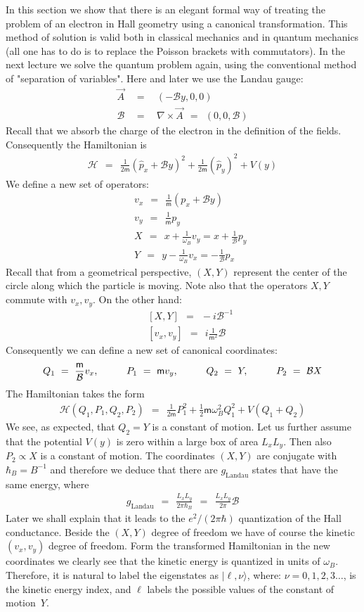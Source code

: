 \documentclass[onecolumn,fleqn]{revtex4}
\newcommand{\mass}{\mathsf{m}}
\newcommand{\beq}{\begin{eqnarray}}
\newcommand{\eeq}{\end{eqnarray}}
\begin{document}
In this section we show that there is 
an elegant formal way of treating the problem 
of an electron in Hall geometry using 
a canonical transformation. 
This method of solution is valid both in classical 
mechanics and in quantum mechanics (all one has to 
do is to replace the Poisson brackets with commutators). 
In the next lecture we solve the quantum problem 
again, using the conventional method of "separation of variables". 
Here and later we use the Landau gauge: 
\beq
\vec{A} & \ \ = \ \ & (-\mathcal{B}y,0,0)
\\ \nonumber
\mathcal{B} & \ \ = \ \ & \nabla \times \vec{A} \ \ = \ \ (0,0,\mathcal{B}) 
\eeq
Recall that we absorb the charge of the electron 
in the definition of the fields. 
Consequently the Hamiltonian is 
\beq
\mathcal{H} 
\ \ = \ \ \frac{1}{2\mass}( \hat{p}_x+\mathcal{B}y)^2 
+ \frac{1}{2\mass}( \hat{p}_y)^2 + V(y) 
\eeq
We define a new set of operators:
\beq
&& v_x \ \ = \ \ \frac{1}{\mass}( p_x + \mathcal{B}y )
\\ \nonumber
&& v_y \ \ = \ \ \frac{1}{\mass} p_y
\\ \nonumber
&& X \ \ = \ \ x + \frac{1}{\omega_B} v_y = x + \frac{1}{\mathcal{B}}p_y
\\ \nonumber
&& Y \ \ = \ \ y - \frac{1}{\omega_B} v_x = - \frac{1}{\mathcal{B}} p_x 
\eeq
Recall that from a geometrical perspective, ${(X,Y)}$ represent 
the center of the circle along which the particle is moving. 
Note also that the operators ${X,Y}$ 
commute with ${v_x,v_y}$. On the other hand:
\beq
&& [X,Y] \ \ = \ \ -i\mathcal{B}^{-1} 
\\ \nonumber
&& [v_x, v_y] \ \ = \ \ i\frac{1}{\mass^2} \mathcal{B} 
\eeq
Consequently we can define a new set of canonical coordinates:
\beq
Q_1 \ = \ \frac{\mass}{\mathcal{B}} v_x,
\hspace*{1cm}
P_1 \ = \ \mass v_y,
\hspace*{1cm}
Q_2 \ = \ Y,
\hspace*{1cm}
P_2 \ = \ \mathcal{B} X 
\eeq
The Hamiltonian takes the form
\beq
\mathcal{H}(Q_1,P_1,Q_2,P_2) 
\ \ = \ \ \frac{1}{2\mass}P_1^2 
+ \frac{1}{2} \mass \omega_B^2 Q_1^2 
+ V(Q_1 + Q_2) 
\eeq
We see, as expected, that ${Q_2 = Y}$ is a constant of motion. 
Let us further assume that the potential $V(y)$ is zero within 
a large box of area $L_xL_y$. Then also ${P_2 \propto X}$ 
is a constant of motion. The coordinates ${(X,Y)}$ are 
conjugate with $\hbar_B=B^{-1}$ and therefore we deduce that 
there are $g_{\text{Landau}}$ states that have the same energy, where 
\beq
g_{\text{Landau}} 
\ \ = \ \ \frac{L_x L_y}{2\pi \hbar_B}
\ \ = \ \ \frac{L_x L_y}{2\pi}\mathcal{B} 
\eeq
Later we shall explain that it leads to the $e^2/(2\pi\hbar)$ 
quantization of the Hall conductance.  
Beside the ${(X,Y)}$ degree of freedom we have of course 
the kinetic ${(v_x,v_y)}$ degree of freedom. 
Form the transformed Hamiltonian in the new coordinates  
we clearly see that the kinetic energy is quantized 
in units of ${\omega_B}$.  
Therefore, it is natural to label the eigenstates 
as ${|\ell , \nu \rangle}$, where: ${\nu = 0,1,2,3 \dots }$, 
is the kinetic energy index, and $\ell$ labels 
the possible values of the constant of motion~$Y$.  
\end{document}

